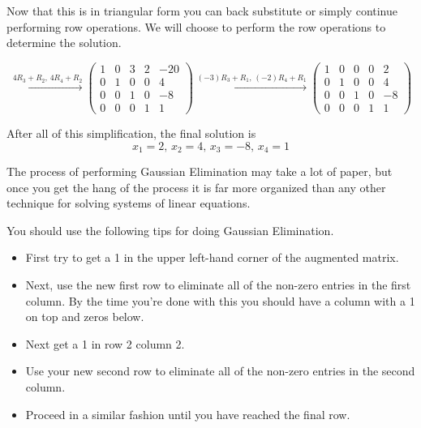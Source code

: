 \begin{example}
Now that this is in triangular form you can back substitute or simply continue performing
row operations.  We will choose to perform the row operations to determine the solution.

 
\[ \stackrel{4R_3+R_2, \, 4R_4+R_2}{\longrightarrow} \left( \begin{array}{cccc|c}
        1 & 0 & 3 & 2 & -20 \\
        0 & 1 & 0 & 0 & 4 \\
        0 & 0 & 1 & 0 & -8 \\
        0 & 0 & 0 & 1 & 1 \end{array} \right)
\stackrel{(-3)R_3+R_1, \, (-2)R_4+R_1}{\longrightarrow} \left( \begin{array}{cccc|c}
        1 & 0 & 0 & 0 & 2 \\
        0 & 1 & 0 & 0 & 4 \\
        0 & 0 & 1 & 0 & -8 \\
        0 & 0 & 0 & 1 & 1 \end{array} \right)
        \]

After all of this simplification, the final solution is 
\[ \boxed{x_1 = 2, \, x_2 = 4, \, x_3 = -8, \, x_4 = 1} \]
\end{example}

The process of performing Gaussian Elimination may take a lot of paper, but once you get
the hang of the process it is far more organized than any other technique for solving
systems of linear equations.  

\begin{technique}
You should use the following tips for doing Gaussian Elimination.
\begin{itemize}
    \item First try to get a 1 in the upper left-hand corner of the augmented matrix.
    \item Next, use the new first row to eliminate all of the non-zero entries in the
        first column.  By the time you're done with this you should have a column with a 1
        on top and zeros below.
    \item Next get a 1 in row 2 column 2.
    \item Use your new second row to eliminate all of the non-zero entries in the second
        column.
    \item Proceed in a similar fashion until you have reached the final row.
\end{itemize}
\end{technique}

